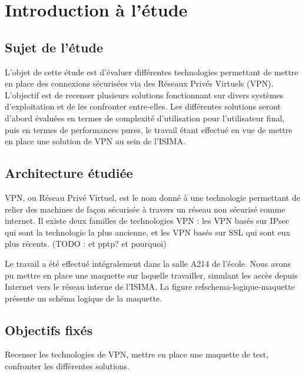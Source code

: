 \section{Introduction à l'étude}
\subsection{Sujet de l'étude}
L'objet de cette étude est d'évaluer différentes technologies permettant de mettre en place des connexions sécurisées via des Réseaux Privés Virtuels (VPN). L'objectif est de recenser plusieurs solutions fonctionnant sur divers systèmes d'exploitation et de les confronter entre-elles. Les différentes solutions seront d'abord évaluées en termes de complexité d'utilisation pour l'utilisateur final, puis en termes de performances pures, le travail étant effectué en vue de mettre en place une solution de VPN au sein de l'ISIMA.

\subsection{Architecture étudiée}
VPN, ou Réseau Privé Virtuel, est le nom donné à une technologie permettant de relier des machines de façon sécurisée à travers un réseau non sécurisé comme internet. Il existe deux familles de technologies VPN : les VPN basés sur IPsec qui sont la technologie la plus ancienne, et les VPN basés sur SSL qui sont eux plus récents. (TODO : et pptp? et pourquoi)

Le travail a été effectué intégralement dans la salle A214 de l'école. Nous avons pu mettre en place une maquette sur laquelle travailler, simulant les accès depuis Internet vers le réseau interne de l'ISIMA. La figure ref{schema-logique-maquette} présente un schéma logique de la maquette.

\subsection{Objectifs fixés}
Recenser les technologies de VPN, mettre en place une maquette de test, confronter les différentes solutions.

\pagebreak
